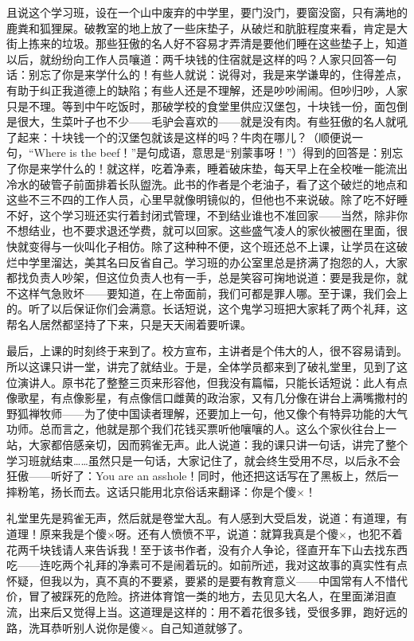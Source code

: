 且说这个学习班，设在一个山中废弃的中学里，要门没门，要窗没窗，只有满地的鹿粪和狐狸屎。破教室的地上放了一些床垫子，从破烂和肮脏程度来看，肯定是大街上拣来的垃圾。那些狂傲的名人好不容易才弄清是要他们睡在这些垫子上，知道以后，就纷纷向工作人员嚷道：两千块钱的住宿就是这样的吗？人家只回答一句话：别忘了你是来学什么的！有些人就说：说得对，我是来学谦卑的，住得差点，有助于纠正我道德上的缺陷；有些人还是不理解，还是吵吵闹闹。但吵归吵，人家只是不理。等到中午吃饭时，那破学校的食堂里供应汉堡包，十块钱一份，面包倒是很大，生菜叶子也不少——毛驴会喜欢的——就是没有肉。有些狂傲的名人就吼了起来：十块钱一个的汉堡包就该是这样的吗？牛肉在哪儿？（顺便说一句，“Where is the beef！”是句成语，意思是“别蒙事呀！”）得到的回答是：别忘了你是来学什么的！就这样，吃着净素，睡着破床垫，每天早上在全校唯一能流出冷水的破管子前面排着长队盥洗。此书的作者是个老油子，看了这个破烂的地点和这些不三不四的工作人员，心里早就像明镜似的，但他也不来说破。除了吃不好睡不好，这个学习班还实行着封闭式管理，不到结业谁也不准回家——当然，除非你不想结业，也不要求退还学费，就可以回家。这些盛气凌人的家伙被圈在里面，很快就变得与一伙叫化子相仿。除了这种种不便，这个班还总不上课，让学员在这破烂中学里溜达，美其名曰反省自己。学习班的办公室里总是挤满了抱怨的人，大家都找负责人吵架，但这位负责人也有一手，总是笑容可掬地说道：要是我是你，就不这样气急败坏——要知道，在上帝面前，我们可都是罪人哪。至于课，我们会上的。听了以后保证你们会满意。长话短说，这个鬼学习班把大家耗了两个礼拜，这帮名人居然都坚持了下来，只是天天闹着要听课。　 

最后，上课的时刻终于来到了。校方宣布，主讲者是个伟大的人，很不容易请到。所以这课只讲一堂，讲完了就结业。于是，全体学员都来到了破礼堂里，见到了这位演讲人。原书花了整整三页来形容他，但我没有篇幅，只能长话短说：此人有点像歌星，有点像影星，有点像信口雌黄的政治家，又有几分像在讲台上满嘴撒村的野狐禅牧师——为了使中国读者理解，还要加上一句，他又像个有特异功能的大气功师。总而言之，他就是那个我们花钱买票听他嚷嚷的人。这么个家伙往台上一站，大家都倍感亲切，因而鸦雀无声。此人说道：我的课只讲一句话，讲完了整个学习班就结束……虽然只是一句话，大家记住了，就会终生受用不尽，以后永不会狂傲——听好了：You are an asshole！同时，他还把这话写在了黑板上，然后一摔粉笔，扬长而去。这话只能用北京俗话来翻译：你是个傻×！　 

礼堂里先是鸦雀无声，然后就是卷堂大乱。有人感到大受启发，说道：有道理，有道理！原来我是个傻×呀。还有人愤愤不平，说道：就算我真是个傻×，也犯不着花两千块钱请人来告诉我！至于该书作者，没有介人争论，径直开车下山去找东西吃——连吃两个礼拜的净素可不是闹着玩的。如前所述，我对这故事的真实性有点怀疑，但我以为，真不真的不要紧，要紧的是要有教育意义——中国常有人不惜代价，冒了被踩死的危险。挤进体育馆一类的地方，去见见大名人，在里面涕泪直流，出来后又觉得上当。这道理是这样的：用不着花很多钱，受很多罪，跑好远的路，洗耳恭听别人说你是傻×。自己知道就够了。

